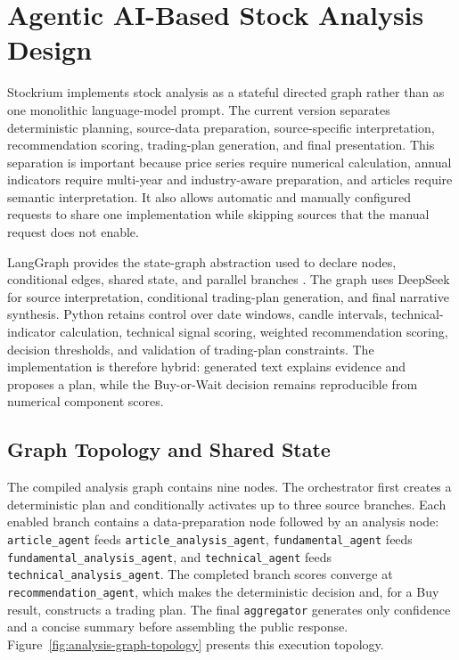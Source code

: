 \section{Agentic AI-Based Stock Analysis Design}
\label{sec:agentic-ai-stock-analysis-design}

Stockrium implements stock analysis as a stateful directed graph rather than as one monolithic language-model prompt. The current version separates deterministic planning, source-data preparation, source-specific interpretation, recommendation scoring, trading-plan generation, and final presentation. This separation is important because price series require numerical calculation, annual indicators require multi-year and industry-aware preparation, and articles require semantic interpretation. It also allows automatic and manually configured requests to share one implementation while skipping sources that the manual request does not enable.

LangGraph provides the state-graph abstraction used to declare nodes, conditional edges, shared state, and parallel branches \cite{langgraph2026graphapi}. The graph uses DeepSeek for source interpretation, conditional trading-plan generation, and final narrative synthesis. Python retains control over date windows, candle intervals, technical-indicator calculation, technical signal scoring, weighted recommendation scoring, decision thresholds, and validation of trading-plan constraints. The implementation is therefore hybrid: generated text explains evidence and proposes a plan, while the Buy-or-Wait decision remains reproducible from numerical component scores.

\subsection{Graph Topology and Shared State}
\label{subsec:analysis-graph-state}

The compiled analysis graph contains nine nodes. The orchestrator first creates a deterministic plan and conditionally activates up to three source branches. Each enabled branch contains a data-preparation node followed by an analysis node: \texttt{article\_agent} feeds \texttt{article\_analysis\_agent}, \texttt{fundamental\_agent} feeds \texttt{fundamental\_analysis\_agent}, and \texttt{technical\_agent} feeds \texttt{technical\_analysis\_agent}. The completed branch scores converge at \texttt{recommendation\_agent}, which makes the deterministic decision and, for a Buy result, constructs a trading plan. The final \texttt{aggregator} generates only confidence and a concise summary before assembling the public response. Figure~\ref{fig:analysis-graph-topology} presents this execution topology.

